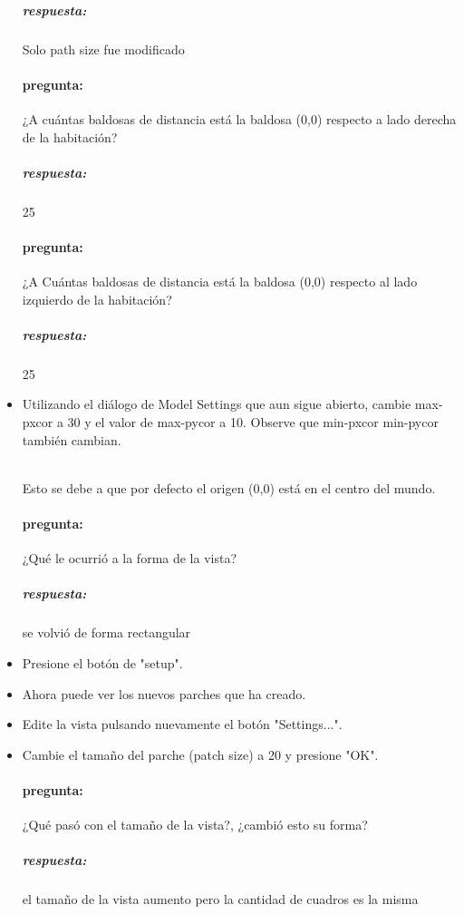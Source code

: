 \documentclass[12pt,letterpaper]{article}
\begin{document}
\begin{itemize}
	\subparagraph{respuesta:}		
		Solo path size fue modificado
		
	\paragraph{pregunta:}
		¿A cuántas baldosas de distancia está la baldosa (0,0) respecto a lado derecha de la habitación?
		
	\subparagraph{respuesta:}		
		25
		
	\paragraph{pregunta:}
		¿A Cuántas baldosas de distancia está la baldosa (0,0) respecto al lado izquierdo de la habitación?
		
	\subparagraph{respuesta:}		
		25


	\item Utilizando el diálogo de Model Settings que aun sigue abierto, cambie max-pxcor a 30 y el valor de max-pycor a 10. Observe que min-pxcor min-pycor también cambian. 
	
	\hfill \\	
	
	Esto se debe a que por defecto el origen (0,0) está en el centro del mundo.
	
	
	\paragraph{pregunta:}
		¿Qué le ocurrió a la forma de la vista?

	\subparagraph{respuesta:}		
		se volvió de forma rectangular

	\item Presione el botón de "setup".
	
	\item Ahora puede ver los nuevos parches que ha creado.

	\item Edite la vista pulsando nuevamente el botón "Settings...".

	\item Cambie el tamaño del parche (patch size) a 20 y presione "OK".

	\paragraph{pregunta:}		
		¿Qué pasó con el tamaño de la vista?, ¿cambió esto su forma?
	
	\subparagraph{respuesta:}
		el tamaño de la vista aumento pero la cantidad de cuadros es la misma

	
\end{itemize}
\end{document}
